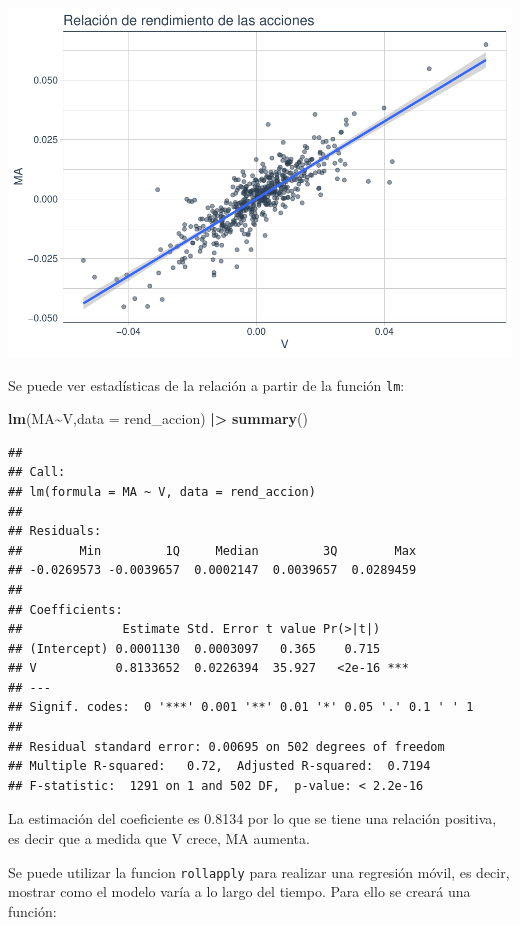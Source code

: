 \documentclass[
]{book}
\newenvironment{Shaded}{\begin{snugshade}}{\end{snugshade}}
\newcommand{\AttributeTok}[1]{\textcolor[rgb]{0.13,0.29,0.53}{#1}}
\newcommand{\FunctionTok}[1]{\textcolor[rgb]{0.13,0.29,0.53}{\textbf{#1}}}
\newcommand{\NormalTok}[1]{#1}
\newcommand{\SpecialCharTok}[1]{\textcolor[rgb]{0.81,0.36,0.00}{\textbf{#1}}}
\begin{document}
\includegraphics{Libro_TidyQualityTools_files/figure-latex/unnamed-chunk-71-1.pdf}

Se puede ver estadísticas de la relación a partir de la función \texttt{lm}:

\begin{Shaded}
\begin{Highlighting}[]
\FunctionTok{lm}\NormalTok{(MA}\SpecialCharTok{\textasciitilde{}}\NormalTok{V,}\AttributeTok{data =}\NormalTok{ rend\_accion) }\SpecialCharTok{|\textgreater{}} \FunctionTok{summary}\NormalTok{()}
\end{Highlighting}
\end{Shaded}

\begin{verbatim}
## 
## Call:
## lm(formula = MA ~ V, data = rend_accion)
## 
## Residuals:
##        Min         1Q     Median         3Q        Max 
## -0.0269573 -0.0039657  0.0002147  0.0039657  0.0289459 
## 
## Coefficients:
##              Estimate Std. Error t value Pr(>|t|)    
## (Intercept) 0.0001130  0.0003097   0.365    0.715    
## V           0.8133652  0.0226394  35.927   <2e-16 ***
## ---
## Signif. codes:  0 '***' 0.001 '**' 0.01 '*' 0.05 '.' 0.1 ' ' 1
## 
## Residual standard error: 0.00695 on 502 degrees of freedom
## Multiple R-squared:   0.72,  Adjusted R-squared:  0.7194 
## F-statistic:  1291 on 1 and 502 DF,  p-value: < 2.2e-16
\end{verbatim}

La estimación del coeficiente es 0.8134 por lo que se tiene una relación positiva, es decir que a medida que V crece, MA aumenta.

Se puede utilizar la funcion \texttt{rollapply} para realizar una regresión móvil, es decir, mostrar como el modelo varía a lo largo del tiempo. Para ello se creará una función:
\end{document}
